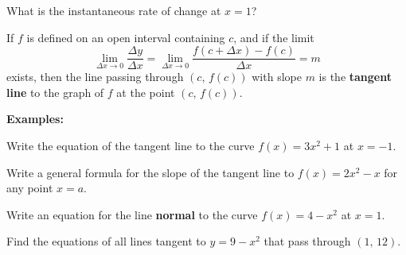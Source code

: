 \documentclass[addpoints, 12pt]{exam}
\begin{document}
What is the instantaneous rate of change at $x=1$?

\newpage


\begin{tcolorbox}[title= DEFINITION OF TANGENT LINE WITH SLOPE \textit{m},black,sharp corners,colback=white,colbacktitle=white,coltitle=black,boxrule=1pt]

    If $f$ is defined on an open interval containing $c$, and if the limit
    \[\lim_{\Delta x\to0}\frac{\Delta y}{\Delta x}=\lim_{\Delta x\to0}\frac{f(c+\Delta x)-f(c)}{\Delta x}=m\]
    exists, then the line passing through $(c,\,f(c))$ with slope $m$ is the \textbf{tangent line} to the graph of $f$ at the point $(c,\,f(c))$.
    
\end{tcolorbox}
\vspace{.15cm}
\noindent\textbf{Examples:}
\begin{questions}
    \question Write the equation of the tangent line to the curve $f(x)=3x^2+1$ at $x=-1$. 
    
    \question Write a general formula for the slope of the tangent line to $f(x)=2x^2-x$ for any point $x=a$.
    
    \question Write an equation for the line \textbf{normal} to the curve $f(x)=4-x^2$ at $x=1$.
    
    \question Find the equations of all lines tangent to $y=9-x^2$ that pass through $(1,\,12)$.
\end{questions}


\newpage
{}
\end{document}
